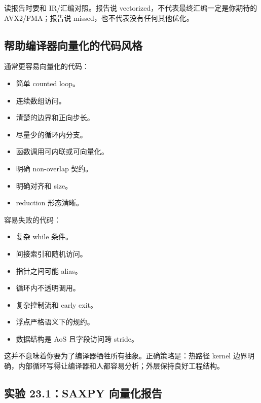 读报告时要和 IR/汇编对照。报告说 vectorized，不代表最终汇编一定是你期待的 AVX2/FMA；报告说 missed，也不代表没有任何其他优化。

\subsection{帮助编译器向量化的代码风格}

通常更容易向量化的代码：

\begin{itemize}
  \item 简单 counted loop。
  \item 连续数组访问。
  \item 清楚的边界和正向步长。
  \item 尽量少的循环内分支。
  \item 函数调用可内联或可向量化。
  \item 明确 non-overlap 契约。
  \item 明确对齐和 size。
  \item reduction 形态清晰。
\end{itemize}

容易失败的代码：

\begin{itemize}
  \item 复杂 while 条件。
  \item 间接索引和随机访问。
  \item 指针之间可能 alias。
  \item 循环内不透明调用。
  \item 复杂控制流和 early exit。
  \item 浮点严格语义下的规约。
  \item 数据结构是 AoS 且字段访问跨 stride。
\end{itemize}

这并不意味着你要为了编译器牺牲所有抽象。正确策略是：热路径 kernel 边界明确，内部循环写得让编译器和人都容易分析；外层保持良好工程结构。

\subsection{实验 23.1：SAXPY 向量化报告}

